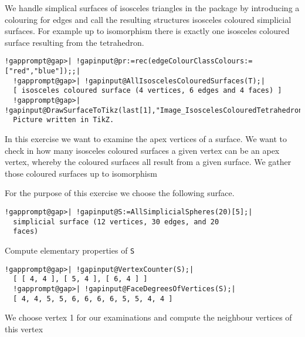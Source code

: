 \documentclass[a4paper,11pt]{report}
\begin{document}
{{ We handle simplical surfaces of isosceles triangles in the package by
introducing a colouring for edges and call the resulting structures isosceles
coloured simplicial surfaces. For example up to isomorphism there is exactly
one isosceles coloured surface resulting from the tetrahedron. 

 
\begin{Verbatim}[commandchars=!@|,fontsize=\small,frame=single,label=Example]
  !gapprompt@gap>| !gapinput@pr:=rec(edgeColourClassColours:=["red","blue"]);;|
  !gapprompt@gap>| !gapinput@AllIsoscelesColouredSurfaces(T);|
  [ isosceles coloured surface (4 vertices, 6 edges and 4 faces) ]
  !gapprompt@gap>| !gapinput@DrawSurfaceToTikz(last[1],"Image_IsoscelesColouredTetrahedron1.tex",pr);|
  Picture written in TikZ.
\end{Verbatim}
 

 
\begin{center}

\end{center}
 

 In this exercise we want to examine the apex vertices of a surface. We want to
check in how many isosceles coloured surfaces a given vertex can be an apex
vertex, whereby the coloured surfaces all result from a given surface. We
gather those coloured surfaces up to isomorphism 

 For the purpose of this exercise we choose the following surface. 
\begin{Verbatim}[commandchars=!@|,fontsize=\small,frame=single,label=Example]
  !gapprompt@gap>| !gapinput@S:=AllSimplicialSpheres(20)[5];|
  simplicial surface (12 vertices, 30 edges, and 20 
  faces)
\end{Verbatim}
 

 
\begin{center}

\end{center}
 

 Compute elementary properties of \texttt{S} 

 
\begin{Verbatim}[commandchars=!@|,fontsize=\small,frame=single,label=Example]
  !gapprompt@gap>| !gapinput@VertexCounter(S);|
  [ [ 4, 4 ], [ 5, 4 ], [ 6, 4 ] ]
  !gapprompt@gap>| !gapinput@FaceDegreesOfVertices(S);|
  [ 4, 4, 5, 5, 6, 6, 6, 6, 5, 5, 4, 4 ]
\end{Verbatim}
 

 We choose vertex 1 for our examinations and compute the neighbour vertices of
this vertex 

}}
\end{document}
